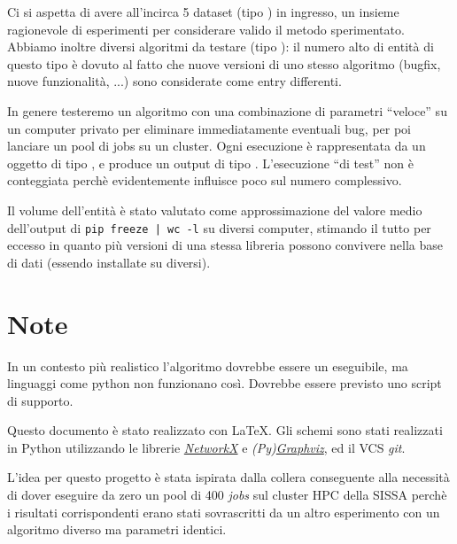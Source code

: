 \documentclass{article}
\begin{document}
Ci si aspetta di avere all'incirca 5 dataset (tipo ) in ingresso, un insieme ragionevole di esperimenti per considerare valido il metodo sperimentato. Abbiamo inoltre diversi algoritmi da testare  (tipo ): il numero alto di entità di questo tipo è dovuto al fatto che nuove versioni di uno stesso algoritmo (bugfix, nuove funzionalità, ...) sono considerate come entry differenti.

In genere testeremo un algoritmo con una combinazione di parametri ``veloce'' su un computer privato per eliminare immediatamente eventuali bug, per poi lanciare un pool di jobs su un cluster. Ogni esecuzione è rappresentata da un oggetto di tipo , e produce un output di tipo . L'esecuzione ``di test'' non è conteggiata perchè evidentemente influisce poco sul numero complessivo.

Il volume dell'entità  è stato valutato come approssimazione del valore medio dell'output di \texttt{pip freeze | wc -l} su diversi computer, stimando il tutto per eccesso in quanto più versioni di una stessa libreria possono convivere nella base di dati (essendo installate su  diversi).

\section{Note}
In un contesto più realistico l'algoritmo dovrebbe essere un eseguibile, ma linguaggi come python non funzionano così. Dovrebbe essere previsto uno script di supporto.

Questo documento è stato realizzato con \LaTeX. Gli schemi sono stati realizzati in Python utilizzando le librerie \href{https://networkx.org/documentation/stable/index.html}{\emph{NetworkX}} e \emph{(Py)\href{http://www.graphviz.org/}{Graphviz}}, ed il VCS \emph{git}.

L'idea per questo progetto è stata ispirata dalla collera conseguente alla necessità di dover eseguire da zero un pool di 400 \emph{jobs} sul cluster HPC della SISSA perchè i risultati corrispondenti erano stati sovrascritti da un altro esperimento con un algoritmo diverso ma parametri identici.
\end{document}
